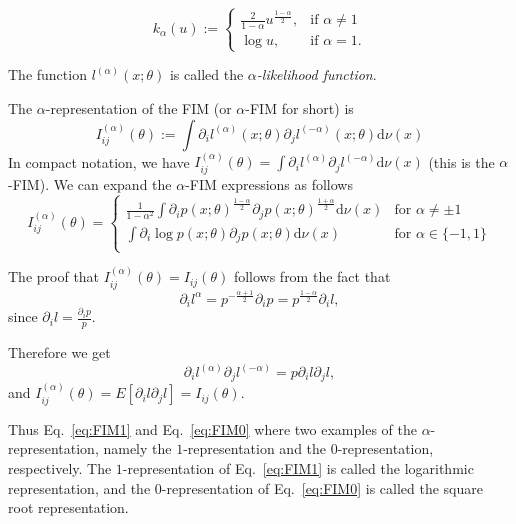 \documentclass[11pt]{article}
\def\eqdef{:=}
\def\dnu{\mathrm{d}\nu}
\begin{document}
\begin{equation}\label{eq:alphaembedding}
k_\alpha(u) \eqdef \left\{
\begin{array}{ll}
\frac{2}{1-\alpha}u^{\frac{1-\alpha}{2}}, & \mbox{if $\alpha\not=1$}\\
\log u, & \mbox{if $\alpha=1$}.
\end{array}
\right.
\end{equation}

The function $l^{(\alpha)}(x;\theta)$ is called the {\em $\alpha$-likelihood function}.

The $\alpha$-representation of the FIM (or $\alpha$-FIM for short) is
\begin{equation}\label{eq:FIMalpha}
\boxed{I_{ij}^{(\alpha)}(\theta) \eqdef \int \partial_i l^{(\alpha)}(x;\theta)\partial_j l^{(-\alpha)}(x;\theta) \dnu(x)}
\end{equation}
In compact notation, we have $I_{ij}^{(\alpha)}(\theta)=\int  \partial_i l^{(\alpha)}\partial_j l^{(-\alpha)} \dnu(x)$ (this is the $\alpha$-FIM).
We can expand the $\alpha$-FIM expressions as follows
$$
I_{ij}^{(\alpha)}(\theta) = \left\{
\begin{array}{ll}
\frac{1}{1-\alpha^2}\int \partial_i p(x;\theta)^{\frac{1-\alpha}{2}}  \partial_j p(x;\theta)^{\frac{1+\alpha}{2}} \dnu(x) & \mbox{for $\alpha\not =\pm1$}\\
\int \partial_i \log p(x;\theta) \partial_j p(x;\theta) \dnu(x) & \mbox{for $\alpha\in \{-1,1\}$}\\
\end{array}
\right.
$$


The proof that $I_{ij}^{(\alpha)}(\theta)=I_{ij}(\theta)$ follows from the fact that
$$
\partial_i l^{\alpha} =  p^{-\frac{\alpha+1}{2}}\partial_i p = p^{\frac{1-\alpha}{2}}\partial_i l,
$$
since $\partial_i l=\frac{\partial_i p}{p}$.

Therefore we get
$$
\partial_i l^{(\alpha)}\partial_j l^{(-\alpha)}=p\partial_i l\partial_j l,
$$
and $I_{ij}^{(\alpha)}(\theta)=E[\partial_i l\partial_j l]=I_{ij}(\theta)$.

Thus Eq.~\ref{eq:FIM1} and Eq.~\ref{eq:FIM0} where two examples of the $\alpha$-representation, namely the $1$-representation and the $0$-representation, respectively. The $1$-representation of Eq.~\ref{eq:FIM1} is called the logarithmic representation, and the  $0$-representation of Eq.~\ref{eq:FIM0} 
is called the square root representation.
\end{document}
